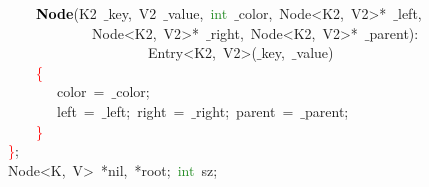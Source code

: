 \begin{center}
\begin{minipage}{120mm}
\mbox{}\ \ \ \ \ \ \ \ \textbf{\textcolor{Black}{Node}}\textcolor{BrickRed}{(}\textcolor{TealBlue}{K2}\ $\_$key\textcolor{BrickRed}{,}\ \textcolor{TealBlue}{V2}\ $\_$value\textcolor{BrickRed}{,}\ \textcolor{ForestGreen}{int}\ $\_$color\textcolor{BrickRed}{,}\ Node\textcolor{BrickRed}{\textless{}}K2\textcolor{BrickRed}{,}\ V2\textcolor{BrickRed}{\textgreater{}*}\ $\_$left\textcolor{BrickRed}{,}\  \\
\mbox{}\ \ \ \ \ \ \ \ \ \ \ \ \ \ \ \ Node\textcolor{BrickRed}{\textless{}}K2\textcolor{BrickRed}{,}\ V2\textcolor{BrickRed}{\textgreater{}*}\ $\_$right\textcolor{BrickRed}{,}\ Node\textcolor{BrickRed}{\textless{}}K2\textcolor{BrickRed}{,}\ V2\textcolor{BrickRed}{\textgreater{}*}\ $\_$parent\textcolor{BrickRed}{):}\  \\
\mbox{}\ \ \ \ \ \ \ \ \ \ \ \ \ \ \ \ \ \ \ \ \ \ \ \ Entry\textcolor{BrickRed}{\textless{}}K2\textcolor{BrickRed}{,}\ V2\textcolor{BrickRed}{\textgreater{}(}$\_$key\textcolor{BrickRed}{,}\ $\_$value\textcolor{BrickRed}{)}\  \\
\mbox{}\ \ \ \ \ \ \ \ \textcolor{Red}{\{} \\
\mbox{}\ \ \ \ \ \ \ \ \ \ \ color\ \textcolor{BrickRed}{=}\ $\_$color\textcolor{BrickRed}{;}\  \\
\mbox{}\ \ \ \ \ \ \ \ \ \ \ left\ \textcolor{BrickRed}{=}\ $\_$left\textcolor{BrickRed}{;}\ right\ \textcolor{BrickRed}{=}\ $\_$right\textcolor{BrickRed}{;}\ parent\ \textcolor{BrickRed}{=}\ $\_$parent\textcolor{BrickRed}{;} \\
\mbox{}\ \ \ \ \ \ \ \ \textcolor{Red}{\}} \\
\mbox{}\ \ \ \ \textcolor{Red}{\}}\textcolor{BrickRed}{;} \\
\mbox{}\ \ \ \ \textcolor{TealBlue}{Node\textless{}K,\ V\textgreater{}}\ \textcolor{BrickRed}{*}nil\textcolor{BrickRed}{,}\ \textcolor{BrickRed}{*}root\textcolor{BrickRed}{;}\ \textcolor{ForestGreen}{int}\ sz\textcolor{BrickRed}{;} 
\end{minipage}\end{center}


